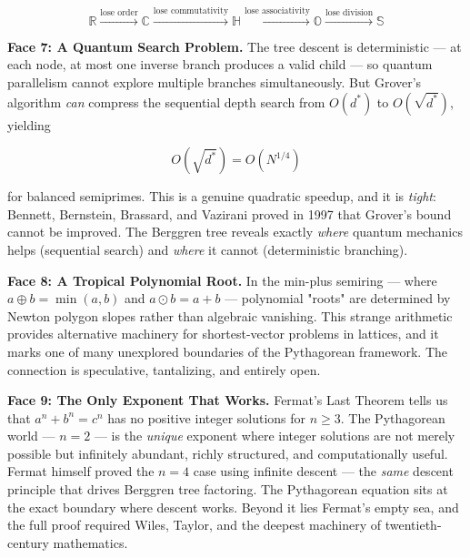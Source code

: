\documentclass[12pt, letterpaper, openany]{book}
\theoremstyle{definition}
\theoremstyle{remark}
\begin{document}
\[
\mathbb{R} \xrightarrow{\text{lose order}} \mathbb{C} \xrightarrow{\text{lose commutativity}} \mathbb{H} \xrightarrow{\text{lose associativity}} \mathbb{O} \xrightarrow{\text{lose division}} \mathbb{S}
\]

\textbf{Face 7: A Quantum Search Problem.} The tree descent is deterministic --- at each node, at most one inverse branch produces a valid child --- so quantum parallelism cannot explore multiple branches simultaneously. But Grover's algorithm \textit{can} compress the sequential depth search from $O(d^*)$ to $O(\sqrt{d^*})$, yielding

\[
O(\sqrt{d^*}) = O(N^{1/4})
\]

for balanced semiprimes. This is a genuine quadratic speedup, and it is \textit{tight}: Bennett, Bernstein, Brassard, and Vazirani proved in 1997 that Grover's bound cannot be improved. The Berggren tree reveals exactly \textit{where} quantum mechanics helps (sequential search) and \textit{where} it cannot (deterministic branching).

\textbf{Face 8: A Tropical Polynomial Root.} In the min-plus semiring --- where $a \oplus b = \min(a,b)$ and $a \odot b = a + b$ --- polynomial "roots" are determined by Newton polygon slopes rather than algebraic vanishing. This strange arithmetic provides alternative machinery for shortest-vector problems in lattices, and it marks one of many unexplored boundaries of the Pythagorean framework. The connection is speculative, tantalizing, and entirely open.

\textbf{Face 9: The Only Exponent That Works.} Fermat's Last Theorem tells us that $a^n + b^n = c^n$ has no positive integer solutions for $n \geq 3$. The Pythagorean world --- $n = 2$ --- is the \textit{unique} exponent where integer solutions are not merely possible but infinitely abundant, richly structured, and computationally useful. Fermat himself proved the $n = 4$ case using infinite descent --- the \textit{same} descent principle that drives Berggren tree factoring. The Pythagorean equation sits at the exact boundary where descent works. Beyond it lies Fermat's empty sea, and the full proof required Wiles, Taylor, and the deepest machinery of twentieth-century mathematics.
\end{document}
